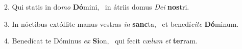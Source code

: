 2. Qui statis in do\textit{mo} \textbf{Dó}mini, \ast\  in átriis domus \textit{De}\textit{i} \textbf{nos}tri.\

3. In nóctibus extóllite manus vestras \textit{in} \textbf{sanc}ta, \ast\  et benedí\textit{ci}\textit{te} \textbf{Dó}minum.\

4. Benedícat te Dóminus \textit{ex} \textbf{Si}on, \ast\  qui fecit cæ\textit{lum} \textit{et} \textbf{ter}ram.\

